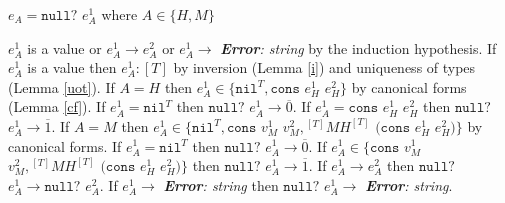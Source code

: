 \begin{case}
$e_{A}=\mathtt{null?}$ $e_{A}^{1}$ where $A\in\lbrace H,M\rbrace$

$e_{A}^{1}$ is a value or $e_{A}^{1}\rightarrow e_{A}^{2}$ or $e_{A}^{1}\rightarrow$ \emph{\textbf{Error}: string} by the induction hypothesis.  If $e_{A}^{1}$ is a value then $e_{A}^{1}:[T]$ by inversion (Lemma \ref{i}) and uniqueness of types (Lemma \ref{uot}).  If $A=H$ then $e_{A}^{1}\in\lbrace\mathtt{nil}^{T},\mathtt{cons}$ $e_{H}^{1}$ $e_{H}^{2}\rbrace$ by canonical forms (Lemma \ref{cf}).  If $e_{A}^{1}=\mathtt{nil}^{T}$ then $\mathtt{null?}$ $e_{A}^{1}\rightarrow\overline{0}$.  If $e_{A}^{1}=\mathtt{cons}$ $e_{H}^{1}$ $e_{H}^{2}$ then $\mathtt{null?}$ $e_{A}^{1}\rightarrow\overline{1}$.  If $A=M$ then $e_{A}^{1}\in\lbrace\mathtt{nil}^{T},\mathtt{cons}$ $v_{M}^{1}$ $v_{M}^{2},{^{[T]}M}H^{[T]}$ $(\mathtt{cons}$ $e_{H}^{1}$ $e_{H}^{2})\rbrace$ by canonical forms.  If $e_{A}^{1}=\mathtt{nil}^{T}$ then $\mathtt{null?}$ $e_{A}^{1}\rightarrow\overline{0}$.  If $e_{A}^{1}\in\lbrace\mathtt{cons}$ $v_{M}^{1}$ $v_{M}^{2},{^{[T]}M}H^{[T]}$ $(\mathtt{cons}$ $e_{H}^{1}$ $e_{H}^{2})\rbrace$ then $\mathtt{null?}$ $e_{A}^{1}\rightarrow\overline{1}$.  If $e_{A}^{1}\rightarrow e_{A}^{2}$ then $\mathtt{null?}$ $e_{A}^{1}\rightarrow\mathtt{null?}$ $e_{A}^{2}$.  If $e_{A}^{1}\rightarrow$ \emph{\textbf{Error}: string} then $\mathtt{null?}$ $e_{A}^{1}\rightarrow$ \emph{\textbf{Error}: string}.
\end{case}